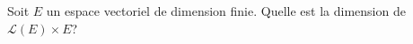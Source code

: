 Soit $E$ un espace vectoriel de dimension finie. Quelle est la dimension de $\mathcal{L}(E)\times E$?

\bigskip